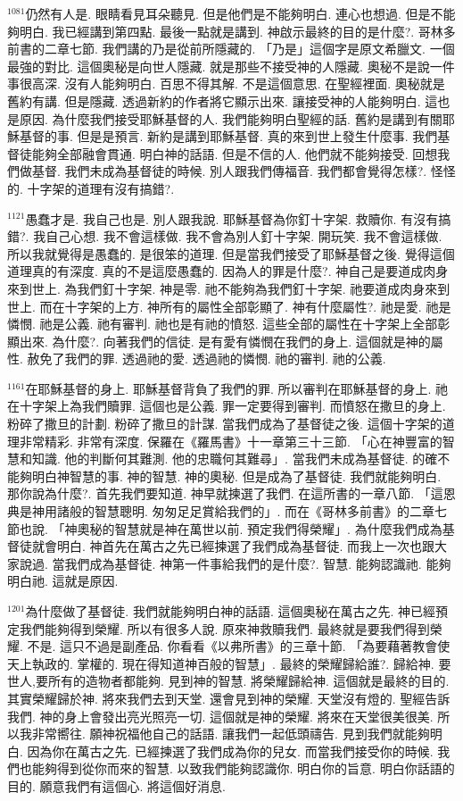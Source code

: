 \documentclass{book}
\begin{document}
$^{1081}$仍然有人是.
眼睛看見耳朵聽見.
但是他們是不能夠明白.
連心也想過.
但是不能夠明白.
我已經講到第四點.
最後一點就是講到.
神啟示最終的目的是什麼?.
哥林多前書的二章七節.
我們講的乃是從前所隱藏的.
「乃是」這個字是原文希臘文.
一個最強的對比.
這個奧秘是向世人隱藏.
就是那些不接受神的人隱藏.
奧秘不是說一件事很高深.
沒有人能夠明白.
百思不得其解.
不是這個意思.
在聖經裡面.
奧秘就是舊約有講.
但是隱藏.
透過新約的作者將它顯示出來.
讓接受神的人能夠明白.
這也是原因.
為什麼我們接受耶穌基督的人.
我們能夠明白聖經的話.
舊約是講到有關耶穌基督的事.
但是是預言.
新約是講到耶穌基督.
真的來到世上發生什麼事.
我們基督徒能夠全部融會貫通.
明白神的話語.
但是不信的人.
他們就不能夠接受.
回想我們做基督.
我們未成為基督徒的時候.
別人跟我們傳福音.
我們都會覺得怎樣?.
怪怪的.
十字架的道理有沒有搞錯?.

$^{1121}$愚蠢才是.
我自己也是.
別人跟我說.
耶穌基督為你釘十字架.
救贖你.
有沒有搞錯?.
我自己心想.
我不會這樣做.
我不會為別人釘十字架.
開玩笑.
我不會這樣做.
所以我就覺得是愚蠢的.
是很笨的道理.
但是當我們接受了耶穌基督之後.
覺得這個道理真的有深度.
真的不是這麼愚蠢的.
因為人的罪是什麼?.
神自己是要道成肉身來到世上.
為我們釘十字架.
神是零.
祂不能夠為我們釘十字架.
祂要道成肉身來到世上.
而在十字架的上方.
神所有的屬性全部彰顯了.
神有什麼屬性?.
祂是愛.
祂是憐憫.
祂是公義.
祂有審判.
祂也是有祂的憤怒.
這些全部的屬性在十字架上全部彰顯出來.
為什麼?.
向著我們的信徒.
是有愛有憐憫在我們的身上.
這個就是神的屬性.
赦免了我們的罪.
透過祂的愛.
透過祂的憐憫.
祂的審判.
祂的公義.

$^{1161}$在耶穌基督的身上.
耶穌基督背負了我們的罪.
所以審判在耶穌基督的身上.
祂在十字架上為我們贖罪.
這個也是公義.
罪一定要得到審判.
而憤怒在撒旦的身上.
粉碎了撒旦的計劃.
粉碎了撒旦的計謀.
當我們成為了基督徒之後.
這個十字架的道理非常精彩.
非常有深度.
保羅在《羅馬書》十一章第三十三節.
「心在神豐富的智慧和知識.
他的判斷何其難測.
他的忠職何其難尋」.
當我們未成為基督徒.
的確不能夠明白神智慧的事.
神的智慧.
神的奧秘.
但是成為了基督徒.
我們就能夠明白.
那你說為什麼?.
首先我們要知道.
神早就揀選了我們.
在這所書的一章八節.
「這恩典是神用諸般的智慧聰明.
匆匆足足賞給我們的」.
而在《哥林多前書》的二章七節也說.
「神奧秘的智慧就是神在萬世以前.
預定我們得榮耀」.
為什麼我們成為基督徒就會明白.
神首先在萬古之先已經揀選了我們成為基督徒.
而我上一次也跟大家說過.
當我們成為基督徒.
神第一件事給我們的是什麼?.
智慧.
能夠認識祂.
能夠明白祂.
這就是原因.

$^{1201}$為什麼做了基督徒.
我們就能夠明白神的話語.
這個奧秘在萬古之先.
神已經預定我們能夠得到榮耀.
所以有很多人說.
原來神救贖我們.
最終就是要我們得到榮耀.
不是.
這只不過是副產品.
你看看《以弗所書》的三章十節.
「為要藉著教會使天上執政的.
掌權的.
現在得知道神百般的智慧」.
最終的榮耀歸給誰?.
歸給神.
要世人,要所有的造物者都能夠.
見到神的智慧.
將榮耀歸給神.
這個就是最終的目的.
其實榮耀歸於神.
將來我們去到天堂.
還會見到神的榮耀.
天堂沒有燈的.
聖經告訴我們.
神的身上會發出亮光照亮一切.
這個就是神的榮耀.
將來在天堂很美很美.
所以我非常嚮往.
願神祝福他自己的話語.
讓我們一起低頭禱告.
見到我們就能夠明白.
因為你在萬古之先.
已經揀選了我們成為你的兒女.
而當我們接受你的時候.
我們也能夠得到從你而來的智慧.
以致我們能夠認識你.
明白你的旨意.
明白你話語的目的.
願意我們有這個心.
將這個好消息.
\end{document}
